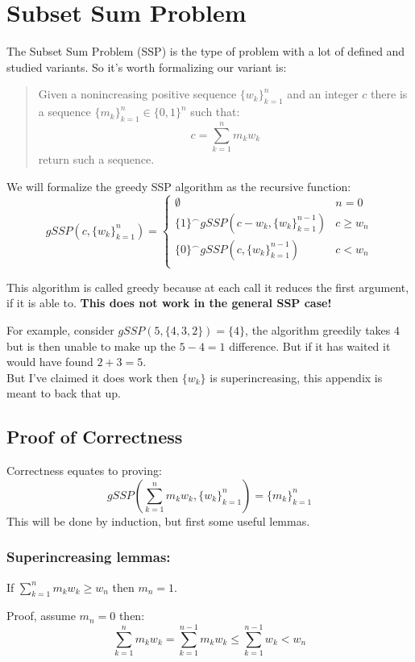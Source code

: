 
\section{Subset Sum Problem}
\label{appx:SSP}
The Subset Sum Problem (SSP) is the type of problem with a lot of defined and studied variants.
So it's worth formalizing our variant is:
\begin{quote}
	Given a nonincreasing positive sequence $\{w_k\}_{k=1}^n$ and an integer $c$ there is a sequence $\{m_k\}_{k=1}^n \in \{0,1\}^n$ such that:
\[c = \sum_{k=1}^nm_kw_k\]
return such a sequence.
\end{quote}

We will formalize the greedy SSP algorithm as the recursive function:
\[gSSP(c,\{w_k\}_{k=1}^n) = \begin{cases}
	\emptyset & n = 0\\
	\{1\}^\frown gSSP(c-w_k,\{w_k\}_{k=1}^{n-1})& c \geq w_n \\
	\{0\}^\frown gSSP(c,\{w_k\}_{k=1}^{n-1})& c < w_n \\
\end{cases}\]

This algorithm is called greedy because at each call it reduces the first argument,
if it is able to.
{\bf This does not work in the general SSP case!}

For example, consider $gSSP(5,\{4,3,2\}) = \{4\}$,
the algorithm greedily takes $4$ but is then unable to make up the $5-4=1$ difference.
But if it has waited it would have found $2+3=5$.
\\

But I've claimed it does work then $\{w_k\}$ is superincreasing, 
this appendix is meant to back that up.

\subsection{Proof of Correctness}
Correctness equates to proving:
\[gSSP\left(\sum_{k=1}^nm_kw_k,\{w_k\}_{k=1}^n\right) =\{m_k\}_{k=1}^n\]
This will be done by induction, 
but first some useful lemmas.

\subsubsection{Superincreasing lemmas:}
If $\sum_{k=1}^nm_kw_k \geq w_n$ then $m_n = 1$.

Proof, assume $m_n = 0$ then:
\[\sum_{k=1}^nm_kw_k = \sum_{k=1}^{n-1}m_kw_k \leq \sum_{k=1}^{n-1}w_k < w_n\]

